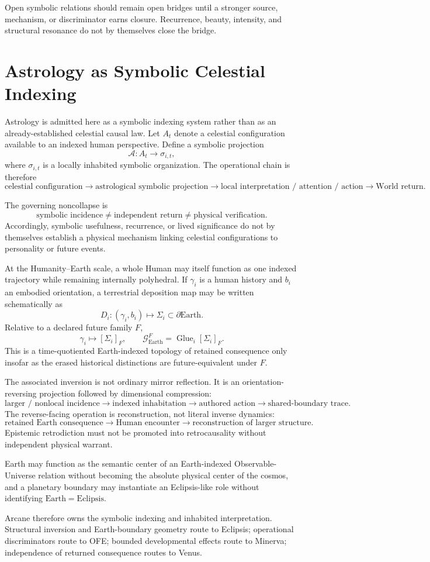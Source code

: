 \documentclass[11pt]{article}
\begin{document}
Open symbolic relations should remain open bridges until a stronger source,
mechanism, or discriminator earns closure.  Recurrence, beauty, intensity, and
structural resonance do not by themselves close the bridge.


\section{Astrology as Symbolic Celestial Indexing}

Astrology is admitted here as a symbolic indexing system rather than as an already-established celestial causal law. Let \(A_t\) denote a celestial configuration available to an indexed human perspective. Define a symbolic projection
\[
\mathcal A:A_t\longrightarrow \sigma_{i,t},
\]
where \(\sigma_{i,t}\) is a locally inhabited symbolic organization. The operational chain is therefore
\[
\text{celestial configuration}
\to
\text{astrological symbolic projection}
\to
\text{local interpretation / attention / action}
\to
\text{World return}.
\]

The governing noncollapse is
\[
\boxed{
\text{symbolic incidence}
\neq
\text{independent return}
\neq
\text{physical verification}.
}
\]
Accordingly, symbolic usefulness, recurrence, or lived significance do not by themselves establish a physical mechanism linking celestial configurations to personality or future events.

At the Humanity--Earth scale, a whole Human may itself function as one indexed trajectory while remaining internally polyhedral. If \(\gamma_i\) is a human history and \(b_i\) an embodied orientation, a terrestrial deposition map may be written schematically as
\[
D_i:(\gamma_i,b_i)\longmapsto \Sigma_i\subset \partial\mathrm{Earth}.
\]
Relative to a declared future family \(F\),
\[
\gamma_i\longmapsto [\Sigma_i]_F,
\qquad
\mathcal G_{\mathrm{Earth}}^{F}=\operatorname{Glue}_i[\Sigma_i]_F.
\]
This is a time-quotiented Earth-indexed topology of retained consequence only insofar as the erased historical distinctions are future-equivalent under \(F\).

The associated inversion is not ordinary mirror reflection. It is an orientation-reversing projection followed by dimensional compression:
\[
\text{larger / nonlocal incidence}
\to
\text{indexed inhabitation}
\to
\text{authored action}
\to
\text{shared-boundary trace}.
\]
The reverse-facing operation is reconstruction, not literal inverse dynamics:
\[
\text{retained Earth consequence}
\to
\text{Human encounter}
\to
\text{reconstruction of larger structure}.
\]
Epistemic retrodiction must not be promoted into retrocausality without independent physical warrant.

Earth may function as the semantic center of an Earth-indexed Observable-Universe relation without becoming the absolute physical center of the cosmos, and a planetary boundary may instantiate an Eclipsis-like role without identifying \(\mathrm{Earth}=\mathrm{Eclipsis}\).

Arcane therefore owns the symbolic indexing and inhabited interpretation. Structural inversion and Earth-boundary geometry route to Eclipsis; operational discriminators route to OFE; bounded developmental effects route to Minerva; independence of returned consequence routes to Venus.
\end{document}
